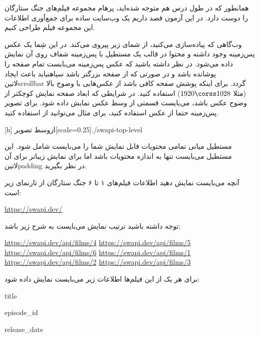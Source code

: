 \documentclass[../main.tex]{subfiles}
\begin{document}

همانطور که در طول درس هم متوجه شده‌اید، پرهام مجموعه فیلم‌های جنگ ستارگان را دوست دارد.
در این آزمون قصد داریم یک وب‌سایت ساده برای جمع‌آوری اطلاعات این مجموعه فیلم طراحی کنیم.

وب‌گاهی که پیاده‌سازی می‌کنید، از شمای زیر پیروی می‌کند. در این شِما یک عکس پس‌زمینه وجود داشته و محتوا در قالب یک مستطیل با پس‌زمینه شفاف روی آن نمایش داده می‌شود.
در نظر داشته باشید که عکس پس‌زمینه می‌بایست تمام صفحه را پوشانده باشد و در صورتی که از صفحه بزرگتر باشد ‌سیاه{نباید} باعث ایجاد ‌لاتین{scrollbar} گردد.
برای اینکه پوشش صفحه کافی باشد از عکس‌هایی با وضوح بالا (مثلا $1920 \corss 1028$) استفاده کنید.
در شرایطی که ابعاد صفحه نمایش کوچکتر از وضوح عکس باشد، می‌بایست قسمتی از وسط عکس نمایش داده شود.
برای تصویر پس‌زمینه حتما از عکس استفاده کنید، برای مثال می‌توانید از  استفاده کنید.

[h]
  ‌ازوسط
  ‌تصویر[scale=0.25]{./swapi-top-level}

مستطیل میانی تمامی محتویات قابل نمایش شما را می‌بایست شامل شود. این مستطیل می‌بایست تنها به اندازه محتویات باشد اما
برای نمایش زیباتر برای آن ‌لاتین{padding} در نظر بگیرید.


آنچه می‌بایست نمایش دهید اطلاعات فیلم‌های ۱ تا ۶ جنگ ستارگان از تارنمای زیر است:

\begin{latin}
  \url{https://swapi.dev/}
\end{latin}

توجه داشته باشید ترتیب نمایش می‌بایست به شرح زیر باشد:

\begin{latin}
  \url{https://swapi.dev/api/films/4}
  \url{https://swapi.dev/api/films/5}
  \url{https://swapi.dev/api/films/6}
  \url{https://swapi.dev/api/films/1}
  \url{https://swapi.dev/api/films/2}
  \url{https://swapi.dev/api/films/3}
\end{latin}

برای هر یک از این فیلم‌ها اطلاعات زیر می‌بایست نمایش داده شود:

\begin{itemize}\begin{latinitems}
  \item title
  \item episode_id
  \item release_date
\end{latinitems}\end{itemize}
\end{document}
